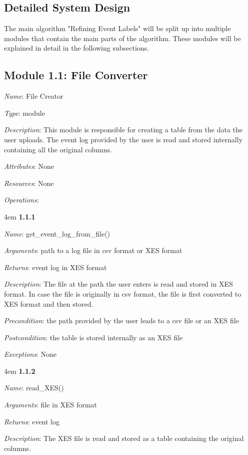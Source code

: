 \documentclass[notitlepage]{article}
\begin{document}
\begin{flushleft}
\section{Detailed System Design}
The main algorithm "Refining Event Labels" will be split up into multiple modules that contain the main parts of the algorithm. These modules will be explained in detail in the following subsections.
\subsection{Module 1.1: File Converter}
\textit{Name}: File Creator

\textit{Type}: module

\textit{Description}: This module is responsible for creating a table from the data the user uploads. The event log provided by the user is read and stored internally containing all the original columns. 

\textit{Attributes}: None

\textit{Resources}: None

\textit{Operations}: 
\medskip

\par
\begingroup
\leftskip4em
\textbf{1.1.1}

\textit{Name}: get\_event\_log\_from\_file()

\textit{Arguments}: path to a log file in csv format or XES format

\textit{Returns}: event log in XES format

\textit{Description}: The file at the path the user enters is read and stored in XES format. In case the file is originally in csv format, the file is first converted to XES format and then stored.

\textit{Precondition}: the path provided by the user leads to a csv file or an XES file

\textit{Postcondition}: the table is stored internally as an XES file

\textit{Exceptions}: None
\par
\endgroup

\medskip

\par
\begingroup
\leftskip4em
\textbf{1.1.2}

\textit{Name}: read\_XES()

\textit{Arguments}: file in XES format

\textit{Returns}: event log 

\textit{Description}: The XES file is read and stored as a table containing the original columns.


\end{flushleft}
\end{document}
